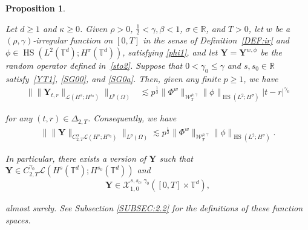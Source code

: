 \documentclass[letterpaper, 11pt,  reqno]{amsart}
\newtheorem{proposition}[theorem]{Proposition}
\DeclareMathOperator{\HS}{HS}
\newcommand{\1}{\hspace{0.5mm}\textup{I}\hspace{0.5mm}}
\newcommand{\noi}{\noindent}
\newcommand{\R}{\mathbb{R}}
\newcommand{\T}{\mathbb{T}}
\newcommand{\al}{\alpha}
\newcommand{\be}{\beta}
\newcommand{\Dl}{\Delta}
\newcommand{\kk}{\kappa}
\newcommand{\g}{\gamma}
\newcommand{\s}{\sigma}
\newcommand{\les}{\lesssim}
\newcommand{\cX}{\mathcal{X}}
\newcommand{\W}{\mathcal{W}}
\newcommand{\Om}{\Omega}
\newcommand{\LOP}{\mathcal{L}}
\newcommand{\YY}{\mathbf{Y}}
\numberwithin{equation}{section}
\numberwithin{theorem}{section}
\begin{document}
\begin{proposition}
\label{PROP:drive4}

Let 
$d\ge 1$ and $\kk \ge 0$.
Given 
$\rho > 0$, 
$\frac 12 < \g, \be < 1$,  $ \s \in \R$, and $T > 0$, 
let 
$w$ be 
 a $(\rho,\g)$-irregular function on $[0, T]$ in the sense of Definition~\ref{DEF:ir}
 and 
$\phi \in \HS(L^2(\T^d); H^\s(\T^d))$, satisfying
\eqref{phi1}, and 
let  $\YY = \YY^{w, \phi}$ be 
the random operator 
 defined in~\eqref{sto2}.
Suppose that 
$0 <  \g_0 \le  \g $ and $s, s_0 \in \R$ satisfy~\eqref{YT1}, 
\eqref{SG00}, and \eqref{SG0a}.
 Then, given any finite $p \ge 1$, we have 
\begin{align}
\big\| \|  \YY_{t,r}  \|_{\LOP(H^s; H^{s_0})} \big\|_{L^p(\Om)} 
 & \les  p^\frac 12 
 \|\Phi^w\|_{  \W^{\rho,\g}_T}\| \phi\|_{\HS(L^2;H^\s)} 
  |t-r|^{\g_0}
\label{SG1}
\end{align}

\noi
for any   $(t,r) \in \Dl_{2,T}$.
Consequently, we have 
\begin{align*}
\big\| \| \YY\|_{C^{\al}_{2,T} \LOP(H^s;H^{s_0})} \big\|_{L^p(\Om)} \les 
p^\frac 12 
 \|\Phi^w\|_{  \W^{\rho,\g}_T} \| \phi\|_{\HS(L^2;H^\s)} .
\end{align*}


\noi
In particular, 
there exists a version of $\YY$
such that 
$\YY \in C^{\g_0}_{2,T} \LOP(H^s(\T^d);H^{s_0}(\T^d))$
and
\begin{align*}
\YY \in  \cX^{s, s_0, \g_0}_{1, 0} ([0, T]\times \T^d) ,
\end{align*}

\noi
almost surely.
See Subsection \ref{SUBSEC:2.2}
for the definitions of these function spaces.







\end{proposition}
\end{document}

